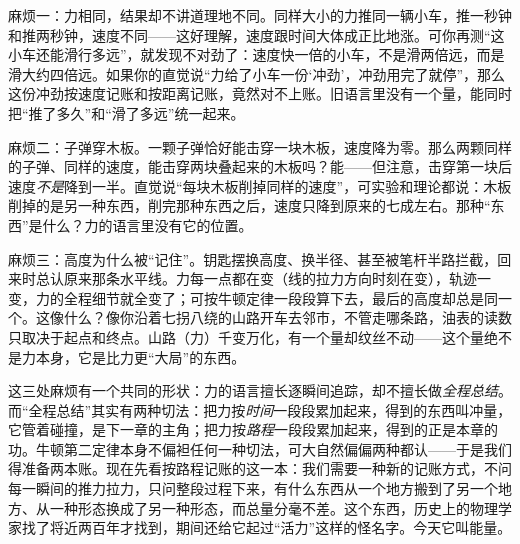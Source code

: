 麻烦一：力相同，结果却不讲道理地不同。同样大小的力推同一辆小车，推一秒钟和推两秒钟，速度不同——这好理解，速度跟时间大体成正比地涨。可你再测“这小车还能滑行多远”，就发现不对劲了：速度快一倍的小车，不是滑两倍远，而是滑大约四倍远。如果你的直觉说“力给了小车一份‘冲劲’，冲劲用完了就停”，那么这份冲劲按速度记账和按距离记账，竟然对不上账。旧语言里没有一个量，能同时把“推了多久”和“滑了多远”统一起来。

麻烦二：子弹穿木板。一颗子弹恰好能击穿一块木板，速度降为零。那么两颗同样的子弹、同样的速度，能击穿两块叠起来的木板吗？能——但注意，击穿第一块后速度\emph{不是}降到一半。直觉说“每块木板削掉同样的速度”，可实验和理论都说：木板削掉的是另一种东西，削完那种东西之后，速度只降到原来的七成左右。那种“东西”是什么？力的语言里没有它的位置。

麻烦三：高度为什么被“记住”。钥匙摆换高度、换半径、甚至被笔杆半路拦截，回来时总认原来那条水平线。力每一点都在变（线的拉力方向时刻在变），轨迹一变，力的全程细节就全变了；可按牛顿定律一段段算下去，最后的高度却总是同一个。这像什么？像你沿着七拐八绕的山路开车去邻市，不管走哪条路，油表的读数只取决于起点和终点。山路（力）千变万化，有一个量却纹丝不动——这个量绝不是力本身，它是比力更“大局”的东西。

这三处麻烦有一个共同的形状：力的语言擅长逐瞬间追踪，却不擅长做\emph{全程总结}。而“全程总结”其实有两种切法：把力按\emph{时间}一段段累加起来，得到的东西叫冲量，它管着碰撞，是下一章的主角；把力按\emph{路程}一段段累加起来，得到的正是本章的功。牛顿第二定律本身不偏袒任何一种切法，可大自然偏偏两种都认——于是我们得准备两本账。现在先看按路程记账的这一本：我们需要一种新的记账方式，不问每一瞬间的推力拉力，只问整段过程下来，有什么东西从一个地方搬到了另一个地方、从一种形态换成了另一种形态，而总量分毫不差。这个东西，历史上的物理学家找了将近两百年才找到，期间还给它起过“活力”这样的怪名字。今天它叫能量。


